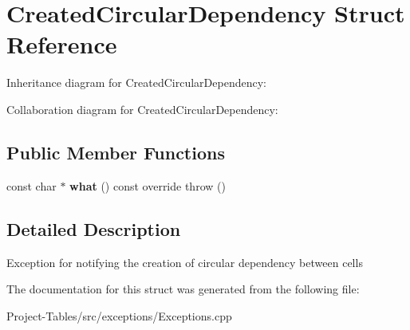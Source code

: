 \hypertarget{structCreatedCircularDependency}{}\section{Created\+Circular\+Dependency Struct Reference}
\label{structCreatedCircularDependency}


Inheritance diagram for Created\+Circular\+Dependency\+:


Collaboration diagram for Created\+Circular\+Dependency\+:
\subsection*{Public Member Functions}
\begin{DoxyCompactItemize}
\item 
\mbox{\label{structCreatedCircularDependency_a574dbe8d13e21f82ac602dd4ff5aa057}} 
const char $\ast$ {\bfseries what} () const override  throw ()
\end{DoxyCompactItemize}


\subsection{Detailed Description}
Exception for notifying the creation of circular dependency between cells 

The documentation for this struct was generated from the following file\+:\begin{DoxyCompactItemize}
\item 
Project-\/\+Tables/src/exceptions/Exceptions.\+cpp\end{DoxyCompactItemize}
